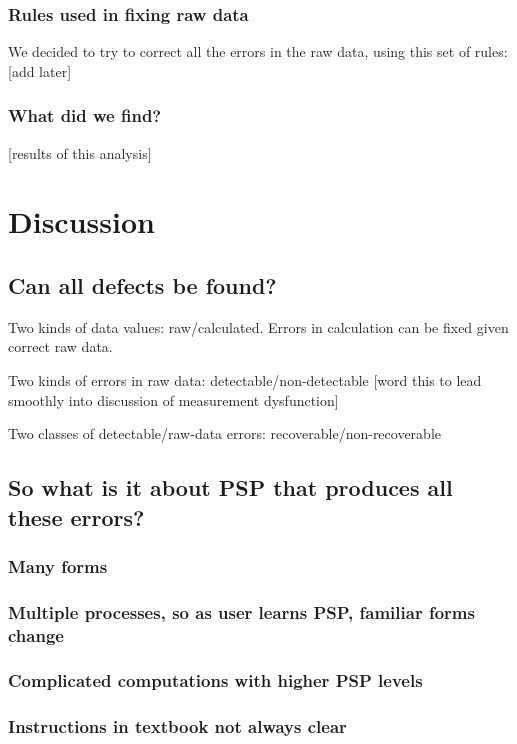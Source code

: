 \subsection{Rules used in fixing raw data}

We decided to try to correct all the errors in the raw data, using this
set of rules: [add later]

\subsection{What did we find?}

[results of this analysis]

\chapter{Discussion}
\section{Can all defects be found?}

Two kinds of data values: raw/calculated.  Errors in calculation can be
fixed given correct raw data. 

Two kinds of errors in raw data: detectable/non-detectable
[word this to lead smoothly into discussion of measurement dysfunction]

Two classes of detectable/raw-data errors:  recoverable/non-recoverable

\section{So what is it about PSP that produces all these errors?}
\subsection{Many forms}
\subsection{Multiple processes, so as user learns PSP, familiar forms 
change}
\subsection{Complicated computations with higher PSP levels}
\subsection{Instructions in textbook not always clear}
